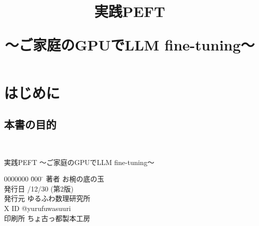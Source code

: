 \documentclass[a5paper,twoside,dvipdfmx]{jsarticle}
\title{実践PEFT

～ご家庭のGPUでLLM fine-tuning～}
\date{}
\begin{document}

\tableofcontents

\newpage

\maketitle

\fontsize{9pt}{16pt}\selectfont

\section{はじめに}



\subsection{本書の目的}




\newpage

\thispagestyle{empty} 

\textcolor{white}{.}
\vspace{\baselineskip}
\vspace{\baselineskip}
\vspace{\baselineskip}
\vspace{\baselineskip}
\vspace{\baselineskip}
\vspace{\baselineskip}
\vspace{\baselineskip}
\vspace{\baselineskip}
\vspace{\baselineskip}
\vspace{\baselineskip}
\vspace{\baselineskip}
\vspace{\baselineskip}
\vspace{\baselineskip}
\vspace{\baselineskip}
\vspace{\baselineskip}
\vspace{\baselineskip}
\vspace{\baselineskip}
\begin{screen}

実践PEFT ～ご家庭のGPUでLLM fine-tuning～

\begin{tabbing}
  0000000 \= 000 \= \kill
  著者 \> お椀の底の玉 \\
  発行日 /12/30 (第2版) \\
  発行元 \> ゆるふわ数理研究所　\\
  X ID \> @yurufuwasuuri \\
  印刷所 \> ちょ古っ都製本工房
\end{tabbing}

\end{screen}

\vspace{\baselineskip}



\end{document}
